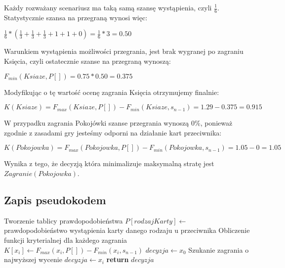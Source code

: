 Każdy rozważany scenariusz ma taką samą szansę wystąpienia, czyli $\frac{1}{6}$. Statystycznie szansa na przegraną wynosi więc:
\begin{center}
 $\frac{1}{6} * (\frac{1}{3} + \frac{1}{3} + \frac{1}{3} + 1 + 1 + 0) = \frac{1}{6} * 3 = 0.50 $
\end{center}
Warunkiem wystąpienia możliwości przegrania, jest brak wygranej po zagraniu Księcia, czyli ostatecznie szanse na przegraną wynoszą:
\begin{center}
	$F_{min}(Ksiaze, P[]) = 0.75 * 0.50 = 0.375$
\end{center}
Modyfikując o tę wartość ocenę zagrania Księcia otrzymujemy finalnie:
\begin{center}
	$K(Ksiaze) =  F_{max}(Ksiaze, P[]) - F_{min}(Ksiaze, s_{n-1}) = 1.29 - 0.375 = 0.915$
\end{center} 
W przypadku zagrania Pokojówki szanse przegrania wynoszą 0\%, ponieważ zgodnie z zasadami gry jesteśmy odporni na działanie kart przeciwnika:
\begin{center}
	$K(Pokojowka) =  F_{max}(Pokojowka, P[]) - F_{min}(Pokojowka, s_{n-1}) = 1.05 - 0 = 1.05$
\end{center} 
Wynika z tego, że decyzją która minimalizuje maksymalną stratę jest $Zagranie(Pokojowka)$.

\subsection{Zapis pseudokodem}
\begin{algorithmic}[1]
		 \Comment Tworzenie tablicy prawdopodobieństwa
			\State $P[rodzajKarty] \gets$  prawdopodobieństwo wystąpienia karty danego rodzaju u przeciwnika	
		\EndFor
		 \Comment Obliczenie funkcji kryterialnej dla każdego zagrania
			\State $K[x_i] \gets F_{max}(x_i, P[]) - F_{min}(x_i, s_{n-1})$
		\EndFor		
		\State $ decyzja \gets x_0$ \Comment Szukanie zagrania o najwyższej wycenie
				\State $decyzja \gets x_i$
			\EndIf
		\EndFor		
		\State \textbf{return} $decyzja$
	\EndFunction
\end{algorithmic}

